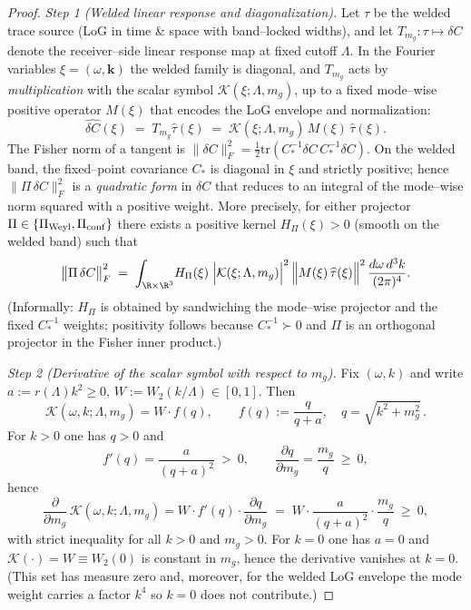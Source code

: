 \documentclass[10pt]{article}
\theoremstyle{definition}
\theoremstyle{plain}
\begin{document}
\begin{proof}
\emph{Step 1 (Welded linear response and diagonalization).}
Let $\tau$ be the welded trace source (LoG in time \& space with band–locked widths), and let
$T_{m_g}:\tau\mapsto \delta C$ denote the receiver–side linear response map at fixed cutoff $\Lambda$.
In the Fourier variables $\xi=(\omega,\mathbf k)$ the welded family is diagonal, and $T_{m_g}$ acts
by \emph{multiplication} with the scalar symbol $\mathcal K(\xi;\Lambda,m_g)$, up to a fixed
mode–wise positive operator $M(\xi)$ that encodes the LoG envelope and normalization:
\[
\widehat{\delta C}(\xi)\;=\;T_{m_g}\widehat{\tau}(\xi)\;=\;\mathcal K(\xi;\Lambda,m_g)\,M(\xi)\,\widehat{\tau}(\xi).
\]
The Fisher norm of a tangent is $\|\delta C\|_F^2=\frac12\mathrm{tr}(C_\ast^{-1}\delta C\,C_\ast^{-1}\delta C)$.
On the welded band, the fixed–point covariance $C_\ast$ is diagonal in $\xi$ and strictly positive; hence
$\|\Pi\,\delta C\|_F^2$ is a \emph{quadratic form} in $\delta C$ that reduces to an integral of the mode–wise
norm squared with a positive weight. More precisely, for either projector $\Pi\in\{\Pi_{\rm Weyl},\Pi_{\rm conf}\}$
there exists a positive kernel $H_\Pi(\xi)>0$ (smooth on the welded band) such that
\begin{equation}\label{eq:Fisher-mode}
\big\|\Pi\,\delta C\big\|_F^2\;=\;\int_{\R\times\R^3}\! H_\Pi(\xi)\;\Big|\mathcal K(\xi;\Lambda,m_g)\Big|^2\,
\Big\|M(\xi)\,\widehat{\tau}(\xi)\Big\|^2\,\frac{d\omega\,d^3k}{(2\pi)^4}.
\end{equation}
(Informally: $H_\Pi$ is obtained by sandwiching the mode–wise projector and the fixed $C_\ast^{-1}$ weights;
positivity follows because $C_\ast^{-1}\succ0$ and $\Pi$ is an orthogonal projector in the Fisher inner product.)

\emph{Step 2 (Derivative of the scalar symbol with respect to $m_g$).}
Fix $(\omega,k)$ and write $a:=r(\Lambda)k^2\ge 0$, $W:=W_2(k/\Lambda)\in[0,1]$. Then
\[
\mathcal K(\omega,k;\Lambda,m_g)=W\cdot f(q),\qquad f(q):=\frac{q}{q+a},\quad q=\sqrt{k^2+m_g^2}\,.
\]
For $k>0$ one has $q>0$ and
\[
f'(q)=\frac{a}{(q+a)^2}\ >\ 0,\qquad \frac{\partial q}{\partial m_g}=\frac{m_g}{q}\ \ge\ 0,
\]
hence
\begin{equation}\label{eq:K-derivative}
\frac{\partial}{\partial m_g}\,\mathcal K(\omega,k;\Lambda,m_g)
=W\cdot f'(q)\cdot \frac{\partial q}{\partial m_g}\;=\;W\cdot \frac{a}{(q+a)^2}\cdot \frac{m_g}{q}\ \ge\ 0,
\end{equation}
with strict inequality for all $k>0$ and $m_g>0$. For $k=0$ one has $a=0$ and $\mathcal K(\cdot)=W\equiv W_2(0)$
is constant in $m_g$, hence the derivative vanishes at $k=0$. (This set has measure zero and, moreover,
for the welded LoG envelope the mode weight carries a factor $k^4$ so $k=0$ does not contribute.)


\end{proof}
\end{document}
